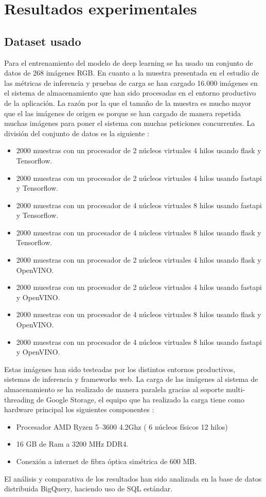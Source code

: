 \mbox{}


\chapter{Resultados experimentales}
\label{ch:chapte5}


\section{Dataset usado}\label{sec:dataset-usado}
Para el entrenamiento del modelo de deep learning se ha usado un conjunto de datos de 268 imágenes RGB\@.
En cuanto a la muestra presentada en el estudio de las métricas de inferencia y pruebas de carga se han cargado 16.000 imágenes en el sistema de almacenamiento que han sido procesadas en el entorno productivo de la aplicación.
La razón por la que el tamaño de la muestra es mucho mayor que el las imágenes de origen es porque se han cargado de manera repetida muchas imágenes para poner el sistema con muchas peticiones concurrentes.
La división del conjunto de datos es la siguiente :
\begin{itemize}
    \item 2000 muestras con un procesador de 2 núcleos virtuales 4 hilos usando flask y Tensorflow.
    \item 2000 muestras con un procesador de 2 núcleos virtuales 4 hilos usando fastapi y Tensorflow.
    \item 2000 muestras con un procesador de 4 núcleos virtuales 8 hilos usando fastapi y Tensorflow.
    \item 2000 muestras con un procesador de 4 núcleos virtuales 8 hilos usando flask y Tensorflow.
    \item 2000 muestras con un procesador de 2 núcleos virtuales 4 hilos usando flask y OpenVINO\@.
    \item 2000 muestras con un procesador de 2 núcleos virtuales 4 hilos usando fastapi y OpenVINO\@.
    \item 2000 muestras con un procesador de 4 núcleos virtuales 8 hilos usando flask y OpenVINO\@.
    \item 2000 muestras con un procesador de 4 núcleos virtuales 8 hilos usando fastapi y OpenVINO\@.
\end{itemize}
Estas imágenes han sido testeadas por los distintos entornos productivos, sistemas de inferencia y frameworks web.
La carga de las imágenes al sistema de almacenamiento se ha realizado de manera paralela gracias al soporte multi-threading de Google Storage, el equipo que ha realizado la carga tiene como hardware principal los siguientes componentes :
\begin{itemize}
    \item Procesador AMD Ryzen 5--3600 4.2Ghz ( 6 núcleos físicos 12 hilos)
    \item 16 GB de Ram a 3200 MHz DDR4.
    \item Conexión a internet de fibra óptica simétrica de 600 MB\@.
\end{itemize}
El análisis y comparativa de los resultados han sido analizada en la base de datos distribuida BigQuery, haciendo uso de SQL estándar.


